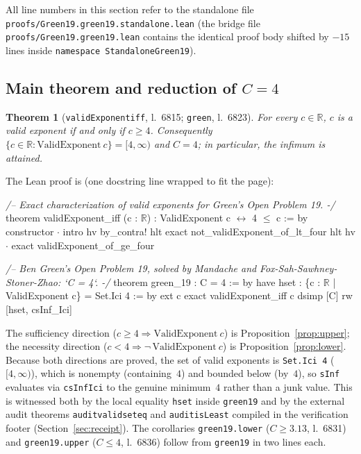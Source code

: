 \documentclass[11pt,reqno]{amsart}
\newtheorem{theorem}{Theorem}
\theoremstyle{remark}
\newcommand{\R}{\mathbb{R}}
\newcommand{\LeanUS}{\textunderscore\hspace{0pt}}
\newcommand{\lean}[1]{{\let\_\LeanUS\texttt{#1}}}
\begin{document}
All line numbers in this section refer to the standalone file \lean{proofs/\allowbreak{}Green19.\allowbreak{}green\_19.\allowbreak{}\allowbreak standalone.\allowbreak{}lean} (the bridge file \lean{proofs/\allowbreak{}Green19.\allowbreak{}green\_19.\allowbreak{}lean} contains the identical proof body shifted by $-15$ lines inside \lean{namespace StandaloneGreen19}).

\subsection{Main theorem and reduction of \texorpdfstring{$C = 4$}{C = 4}}

\begin{theorem}[\lean{validExponent\_iff}, l.~6815; \lean{green\_19}, l.~6823]\label{thm:main}
For every $c \in \R$, $c$ is a valid exponent if and only if $c \ge 4$. Consequently $\{c \in \R : \mathrm{ValidExponent}\ c\} = [4, \infty)$ and $C = 4$; in particular, the infimum is attained.
\end{theorem}

The Lean proof is (one docstring line wrapped to fit the page):

\begin{leancode}
\textit{/-- Exact characterization of valid exponents for Green's Open Problem 19. -/}
theorem validExponent_iff (c : \(\R\)) : ValidExponent c \(\leftrightarrow\) 4 \(\le\) c := by
  constructor
  \(\cdot\) intro hv
    by_contra! hlt
    exact not_validExponent_of_lt_four hlt hv
  \(\cdot\) exact validExponent_of_ge_four

\textit{/-- Ben Green's Open Problem 19, solved by Mandache and}
\textit{    Fox-Sah-Sawhney-Stoner-Zhao: `C = 4`. -/}
theorem green_19 : C = 4 := by
  have hset : \{c : \(\R\) | ValidExponent c\} = Set.Ici 4 := by
    ext c
    exact validExponent_iff c
  dsimp [C]
  rw [hset, csInf_Ici]
\end{leancode}

The sufficiency direction ($c \ge 4 \Rightarrow \mathrm{ValidExponent}\ c$) is Proposition~\ref{prop:upper}; the necessity direction ($c < 4 \Rightarrow \neg\,\mathrm{ValidExponent}\ c$) is Proposition~\ref{prop:lower}. Because both directions are proved, the set of valid exponents is \lean{Set.\allowbreak{}Ici 4} ($[4, \infty)$), which is nonempty (containing~$4$) and bounded below (by~$4$), so \lean{sInf} evaluates via \lean{csInf\_Ici} to the genuine minimum~$4$ rather than a junk value. This is witnessed both by the local equality \lean{hset} inside \lean{green\_19} and by the external audit theorems \lean{audit\_valid\_set\_eq} and \lean{audit\_isLeast} compiled in the verification footer (Section~\ref{sec:receipt}). The corollaries \lean{green\_19.\allowbreak{}lower} ($C \ge 3.13$, l.~6831) and \lean{green\_19.\allowbreak{}upper} ($C \le 4$, l.~6836) follow from \lean{green\_19} in two lines each.
\end{document}
